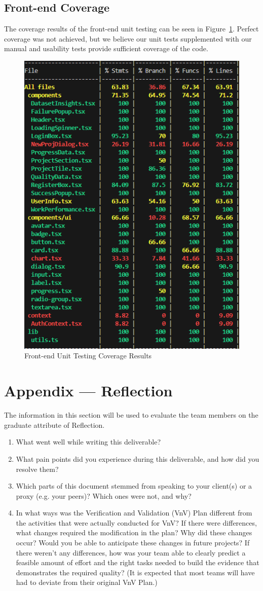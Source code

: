 \documentclass[12pt, titlepage]{article}
\begin{document}
\subsection{Front-end Coverage}
The coverage results of the front-end unit testing can be seen in Figure~\ref{fig:FE_coverage}. Perfect coverage was not achieved, but we believe our unit tests supplemented with our manual and usability tests provide sufficient coverage of the code.
\begin{figure}[H]
    \centering
    \includegraphics[width=0.5\linewidth]{FE_coverage.png}
    \caption{Front-end Unit Testing Coverage Results}
    \label{fig:FE_coverage}
\end{figure}




\newpage{}
\section*{Appendix --- Reflection}

The information in this section will be used to evaluate the team members on the
graduate attribute of Reflection.



\begin{enumerate}
  \item What went well while writing this deliverable? 
  \item What pain points did you experience during this deliverable, and how
    did you resolve them?
  \item Which parts of this document stemmed from speaking to your client(s) or
  a proxy (e.g. your peers)? Which ones were not, and why?
  \item In what ways was the Verification and Validation (VnV) Plan different
  from the activities that were actually conducted for VnV?  If there were
  differences, what changes required the modification in the plan?  Why did
  these changes occur?  Would you be able to anticipate these changes in future
  projects?  If there weren't any differences, how was your team able to clearly
  predict a feasible amount of effort and the right tasks needed to build the
  evidence that demonstrates the required quality?  (It is expected that most
  teams will have had to deviate from their original VnV Plan.)
\end{enumerate}
\end{document}
